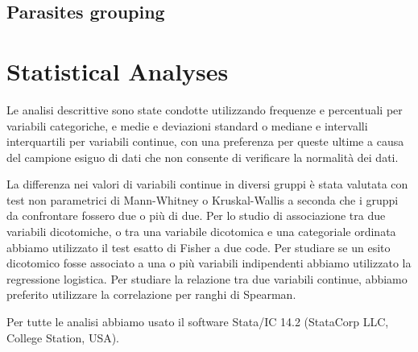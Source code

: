 \subsection{Parasites grouping}\label{sub:parasites}

\section{Statistical Analyses}\label{sec:statisticalanalyses}
Le analisi descrittive sono state condotte utilizzando frequenze e percentuali per variabili categoriche, e medie e deviazioni standard o mediane e intervalli interquartili per variabili continue, con una preferenza per queste ultime a causa del campione esiguo di dati che non consente di verificare la normalità dei dati.

La differenza nei valori di variabili continue in diversi gruppi è stata valutata con test non parametrici di Mann-Whitney o Kruskal-Wallis a seconda che i gruppi da confrontare fossero due o più di due. Per lo studio di associazione tra due variabili dicotomiche, o tra una variabile dicotomica e una categoriale ordinata abbiamo utilizzato il test esatto di Fisher a due code. Per studiare se un esito dicotomico fosse associato a una o più variabili indipendenti abbiamo utilizzato la regressione logistica.
Per studiare la relazione tra due variabili continue, abbiamo preferito utilizzare la correlazione per ranghi di Spearman.

Per tutte le analisi abbiamo usato il software Stata/IC 14.2 (StataCorp LLC, College Station, USA).


